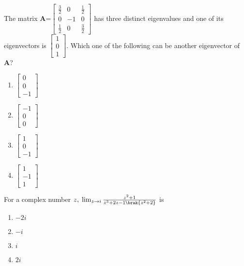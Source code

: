 \iffalse
                                          
\chapter{2017}
\section{ee}
\author{AI24BTECH11023 - Tarun Reddy Pakala}
\fi
\item The matrix \textbf{A}=$
\begin{bmatrix}
\frac{3}{2} & 0 & \frac{1}{2} \\
0 & -1 & 0 \\
\frac{1}{2} & 0 & \frac{3}{2}
\end{bmatrix}
$ has three distinct eigenvalues and one of its eigenvectors is $
\begin{bmatrix}
1  \\
0  \\
1 
\end{bmatrix}
$. Which one of the following can be another eigenvector of \textbf{A}?
\begin{enumerate}
    \item $
\begin{bmatrix}
0  \\
0  \\
-1 
\end{bmatrix}
$
    \item $
\begin{bmatrix}
-1  \\
0  \\
0
\end{bmatrix}
$
    \item $
\begin{bmatrix}
1 \\
0  \\
-1 
\end{bmatrix}
$
    \item $
\begin{bmatrix}
1  \\
-1  \\
1 
\end{bmatrix}
$
\end{enumerate}
\item For a complex number $z,\;\lim_{z\to i}\frac{z^2+1}{z^3+2z-1\brak{z^2+2}}$ is
\begin{enumerate}
    \item $-2i$
    \item $-i$
    \item $i$
    \item $2i$
\end{enumerate}
